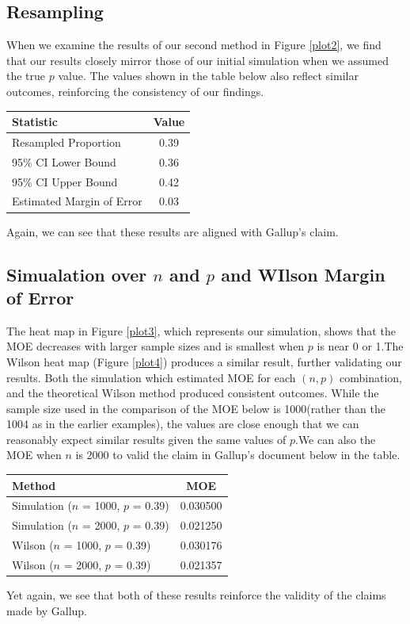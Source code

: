 \documentclass{article}\usepackage[]{graphicx}\usepackage[]{xcolor}
\begin{document}
\begin{multicols}{2}
\subsection{Resampling}
When we examine the results of our second method in Figure \ref{plot2}, we find that our results closely mirror those of our initial simulation when we assumed the true $p$ value. The values shown in the table below also reflect similar outcomes, reinforcing the consistency of our findings. 
\begin{table}[H]
\centering
\small
{}
\label{table2}
\begin{tabular}{lc}
  \hline
 Statistic & Value \\ 
  \hline
  Resampled Proportion & 0.39 \\ 
    95\% CI Lower Bound & 0.36 \\ 
    95\% CI Upper Bound & 0.42 \\ 
    Estimated Margin of Error & 0.03 \\ 
   \hline
\end{tabular}
\end{table}
Again, we can see that these results are aligned with Gallup's claim. 

\subsection{Simualation over $n$ and $p$ and WIlson Margin of Error}
The heat map in Figure \ref{plot3}, which represents our simulation, shows that the MOE decreases with larger sample sizes and is smallest when $p$ is near 0 or 1.The Wilson heat map (Figure \ref{plot4}) produces a similar result, further validating our results. Both the simulation which estimated MOE for each $(n,p)$ combination, and the theoretical Wilson method produced consistent outcomes. While the sample size used in the comparison of the MOE below is 1000(rather than the 1004 as in the earlier examples), the values are close enough that we can reasonably expect similar results given the same values of $p$.We can also the MOE when $n$ is 2000 to valid the claim in Gallup's document below in the table.
\begin{table}[H]
\centering
\small
{}
\begin{tabular}{lc}
  \hline
 Method & MOE \\ 
  \hline
Simulation ($n$ = 1000, $p$ = 0.39) & 0.030500 \\
Simulation ($n$ = 2000, $p$ = 0.39) & 0.021250 \\
Wilson ($n$ = 1000, $p$ = 0.39) & 0.030176 \\ 
Wilson ($n$ = 2000, $p$ = 0.39) & 0.021357\\
   \hline
\end{tabular}
\end{table}
Yet again, we see that both of these results reinforce the validity of the claims made by Gallup.


\end{multicols}
\end{document}
